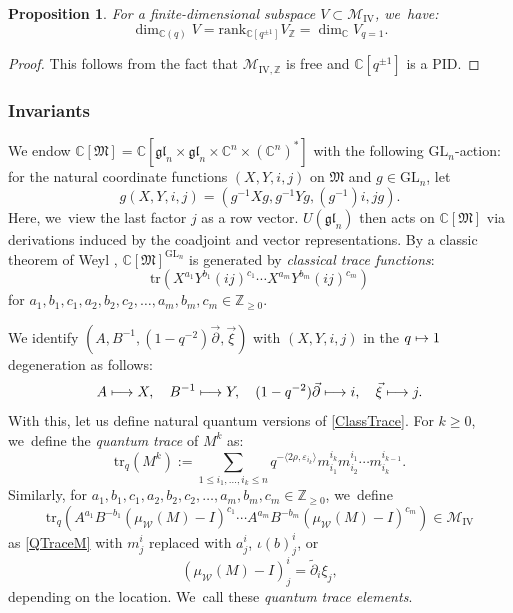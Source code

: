 \documentclass[11pt]{article}
\let\epsilon\varepsilon
\newcommand\mto{\mathchoice{\longmapsto}{\mapsto}{\mapsto}{\mapsto}}
\newcommand{\GL}{\mathrm{GL}}
\newtheorem{prop}[thm]{Proposition}
\theoremstyle{definition}
\newcommand{\ZZ}{\mathbb{Z}}
\newcommand{\CC}{\mathbb{C}}
\newcommand{\WW}{\mathcal{W}}
\newcommand{\MM}{\mathcal{M}}
\newcommand{\tr}{\mathrm{tr}}
\begin{document}
\begin{prop}\label{DimProp}
For a finite-dimensional subspace $V\subset\MM_{\mathrm{IV}}$, we~have:
\begin{equation}
\dim_{\CC(q)}V= \mathrm{rank}_{\CC[q^{\pm 1}]}V_\ZZ =\dim_{\CC}V_{q=1}.
\label{DimBound}
\end{equation}
\end{prop}

\begin{proof}
This follows from the fact that $\MM_{\mathrm{IV,\ZZ}}$ is free and $\CC[q^{\pm 1}]$ is a PID.
\end{proof}

\subsubsection{Invariants}
We endow $\CC[\mathfrak{M}]=\CC\left[\mathfrak{gl}_n\times\mathfrak{gl}_n\times\CC^n\times\left(\CC^n\right)^*\right]$ with the following $\GL_n$-action:
for the natural coordinate functions $(X,Y,i,j)$ on $\mathfrak{M}$ and $g\in \GL_n$, let
\[
g(X,Y,i,j)=(g^{-1}Xg, g^{-1}Yg, (g^{-1})i, jg).
\]
Here, we~view the last factor $j$ as a row vector.
$U(\mathfrak{gl}_n)$ then acts on $\CC[\mathfrak{M}]$ via derivations induced by the coadjoint and vector representations.
By a classic theorem of Weyl \cite{WeylInv}, $\CC[\mathfrak{M}]^{\GL_n}$ is generated by \textit{classical trace functions}:
\begin{equation}
\tr(X^{a_1}Y^{b_1}(i j)^{c_1}\cdots X^{a_m}Y^{b_m}(i j)^{c_m})
\label{ClassTrace}
\end{equation}
for $a_1,b_1,c_1, a_2,b_2, c_2,\ldots, a_m,b_m, c_m\in\ZZ_{\ge 0}$.

We identify $(A,B^{-1},(1-q^{-2})\vec{\partial},\vec{\xi})$ with $(X,Y,i,j)$ in the $q\mto 1$ degeneration as follows:
\begin{equation}
A\mto X,\quad B^{-1}\mto Y,\quad (1-q^{-2})\vec{\partial}\mto i,\quad \vec{\xi}\mto j.
\label{DegenTrans}
\end{equation}
With this, let us define natural quantum versions of \eqref{ClassTrace}.
For $k\ge 0$, we~define the \textit{quantum trace} of $M^k$ as:
\begin{equation}
\tr_q(M^k):=\sum_{1\le i_1,\ldots, i_k\le n} q^{-\langle 2\rho,\epsilon_{i_k}\rangle} m^{i_k}_{i_1}m^{i_1}_{i_2}\cdots m^{i_{k-1}}_{i_{k}}.
\label{QTraceM}
\end{equation}
Similarly, for $a_1,b_1,c_1, a_2,b_2, c_2,\ldots, a_m,b_m, c_m\in\ZZ_{\ge 0}$, we~define
\begin{equation}
\tr_q\left(A^{a_1}B^{-b_1}(\mu_{\WW}(M)-I)^{c_1}\cdots A^{a_m}B^{-b_m}(\mu_{\WW}(M)-I)^{c_m}\right)\in\MM_{\mathrm{IV}}
\label{QTrace}
\end{equation}
as \eqref{QTraceM} with $m_{j}^i$ replaced with $a^{i}_j$, $\iota(b)^{i}_j$, or
\[
\left(\mu_{\WW}(M)-I \right)^i_j=\widetilde{\partial}_i\xi_j,
\]
depending on the location. We~call these \textit{quantum trace elements}.
\end{document}
